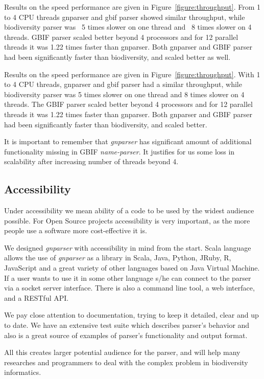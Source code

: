 \documentclass{bmcart}
\begin{document}
Results on the speed performance are given in Figure~\ref{figure:throughput}.
From 1 to 4 CPU threads gnparser and gbif parser showed similar throughput,
while biodiversity parser was ~5 times slower on one thread and ~8 times
slower on 4 threads. GBIF parser scaled better beyond 4 processors and for 12
parallel threads it was 1.22 times faster than gnparser. Both gnparser and
GBIF parser had been significantly faster than biodiversity, and scaled better
as well.

Results on the speed performance are given in Figure~\ref{figure:throughput}.
With 1 to 4 CPU threads, gnparser and gbif parser had a similar throughput,
while biodiversity parser was 5 times slower on one thread and  8 times slower
on 4 threads. The GBIF parser scaled better beyond 4 processors and for 12
parallel threads it was 1.22 times faster than gnparser. Both gnparser and GBIF
parser had been significantly faster than biodiversity, and scaled better.

It is important to remember that \textit{gnparser} has significant amount of
additional functionality missing in GBIF \textit{name-parser}. It justifies for
us some loss in scalability after increasing number of threads beyond 4.

\subsection*{Accessibility}

Under accessibility we mean ability of a code to be used by the widest
audience possible. For Open Source projects accessibility is very important,
as the more people use a software more cost-effective it is.

We designed \textit{gnparser} with accessibility in mind from the start. Scala
language allows the use of \textit{gnparser} as a library in Scala, Java,
Python, JRuby, R, JavaScript and a great variety of other languages based on
Java Virtual Machine. If a user wants to use it in some other language s/he can
connect to the parser via a socket server interface. There is also a command
line tool, a web interface, and a RESTful API.

We pay close attention to documentation, trying to keep it detailed, clear and
up to date. We have an extensive test suite which describes parser's behavior
and also is a great source of examples of parser's functionality and output
format.

All this creates larger potential audience for the parser, and will help many
researches and programmers to deal with the complex problem in biodiversity
informatics.
\end{document}
